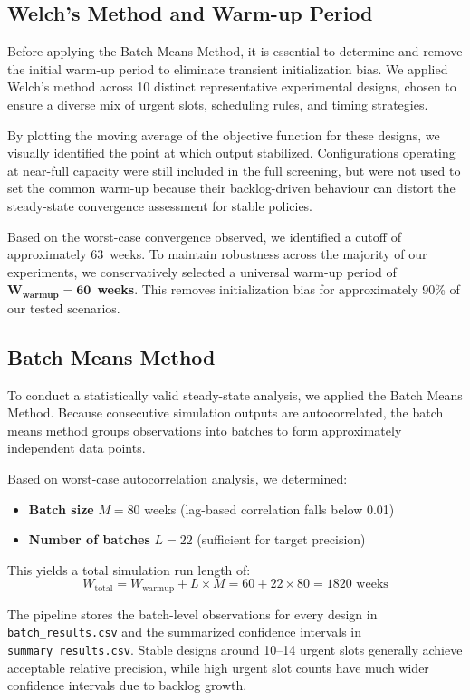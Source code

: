 \documentclass[12pt, a4paper]{article}
\begin{document}
\subsection{Welch's Method and Warm-up Period}

Before applying the Batch Means Method, it is essential to determine and remove the initial warm-up period to eliminate transient initialization bias. We applied Welch's method across 10 distinct representative experimental designs, chosen to ensure a diverse mix of urgent slots, scheduling rules, and timing strategies.

By plotting the moving average of the objective function for these designs, we visually identified the point at which output stabilized. Configurations operating at near-full capacity were still included in the full screening, but were not used to set the common warm-up because their backlog-driven behaviour can distort the steady-state convergence assessment for stable policies.

Based on the worst-case convergence observed, we identified a cutoff of approximately 63~weeks. To maintain robustness across the majority of our experiments, we conservatively selected a universal warm-up period of $\mathbf{W_{\text{warmup}} = 60}$~\textbf{weeks}. This removes initialization bias for approximately 90\% of our tested scenarios.

\subsection{Batch Means Method}

To conduct a statistically valid steady-state analysis, we applied the Batch Means Method. Because consecutive simulation outputs are autocorrelated, the batch means method groups observations into batches to form approximately independent data points.

Based on worst-case autocorrelation analysis, we determined:
\begin{itemize}
    \item \textbf{Batch size} $M = 80$ weeks (lag-based correlation falls below 0.01)
    \item \textbf{Number of batches} $L = 22$ (sufficient for target precision)
\end{itemize}

This yields a total simulation run length of:
\[
    W_{\text{total}} = W_{\text{warmup}} + L \times M = 60 + 22 \times 80 = 1820 \text{ weeks}
\]

The pipeline stores the batch-level observations for every design in \texttt{batch\_results.csv} and the summarized confidence intervals in \texttt{summary\_results.csv}. Stable designs around 10--14 urgent slots generally achieve acceptable relative precision, while high urgent slot counts have much wider confidence intervals due to backlog growth.
\end{document}

